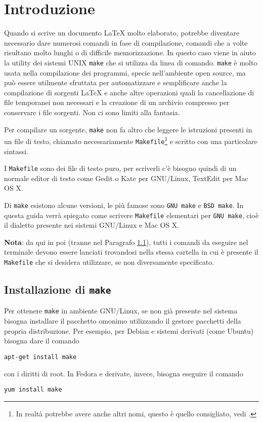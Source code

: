 \cleardoublepage
\chapter{Introduzione}
\label{cha:introduzione}

Quando si scrive un documento \LaTeX{}
molto elaborato, potrebbe diventare necessario dare numerosi comandi in fase di
compilazione, comandi che a volte risultano molto lunghi o di difficile
memorizzazione.  In questo caso viene in aiuto la utility dei sistemi UNIX
\verb|make| che si utilizza da linea di comando. \verb|make| è molto usata nella
compilazione dei programmi, specie nell'ambiente open source, ma può essere
utilmente sfruttata per automatizzare e semplificare anche la compilazione di
sorgenti \LaTeX{}
e anche altre operazioni quali la cancellazione di file temporanei non necessari
e la creazione di un archivio compresso per conservare i file sorgenti.  Non ci
sono limiti alla fantasia.

Per compilare un sorgente, \verb|make| non fa altro che leggere le istruzioni
presenti in un file di testo, chiamato necessariamente
\verb|Makefile|\footnote{In realtà potrebbe avere anche altri nomi, questo è
  quello consigliato, vedi \textcite[12]{gnu:make}.}
e scritto con una particolare sintassi.

I \verb|Makefile| sono dei file di testo puro, per scriverli c'è bisogno quindi
di un normale editor di testo come Gedit o Kate per GNU/Linux, TextEdit per Mac
OS X.

Di \verb|make| esistono alcune versioni, le più famose sono \verb|GNU make| e
\verb|BSD make|.  In questa guida verrà spiegato come scrivere \verb|Makefile|
elementari per \verb|GNU make|, cioè il dialetto presente nei sistemi GNU/Linux
e Mac OS X.

\textbf{Nota}: da qui in poi (tranne nel Paragrafo \ref{sec:installazione}),
tutti i comandi da eseguire nel terminale devono essere lanciati trovandosi
nella stessa cartella in cui è presente il \verb|Makefile| che si desidera
utilizzare, se non diversamente specificato.


\section{Installazione di \texttt{make}}
\label{sec:installazione}

Per ottenere \verb|make| in ambiente GNU/Linux, se non già presente nel sistema
bisogna installare il pacchetto omonimo utilizzando il gestore pacchetti della
propria distribuzione.  Per esempio, per Debian e sistemi derivati (come Ubuntu)
bisogna dare il comando
\begin{verbatim}
apt-get install make
\end{verbatim}
con i diritti di root.  In Fedora e derivate, invece, bisogna eseguire il
comando
\begin{verbatim}
yum install make
\end{verbatim}

